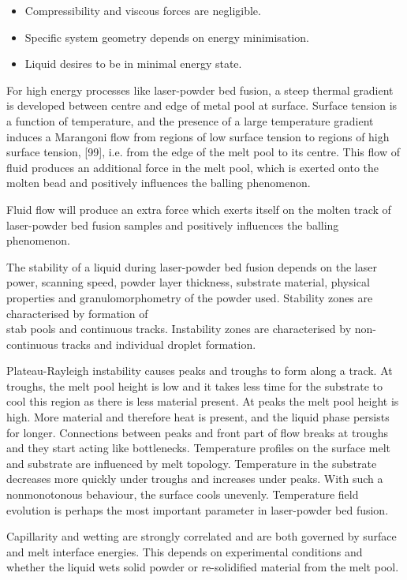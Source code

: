 \documentclass[10pt]{article}
\begin{document}
\begin{itemize}
  \item Compressibility and viscous forces are negligible.
  \item Specific system geometry depends on energy minimisation.
  \item Liquid desires to be in minimal energy state.
\end{itemize}

For high energy processes like laser-powder bed fusion, a steep thermal gradient is developed between centre and edge of metal pool at surface. Surface tension is a function of temperature, and the presence of a large temperature gradient induces a Marangoni flow from regions of low surface tension to regions of high surface tension, [99], i.e. from the edge of the melt pool to its centre. This flow of fluid produces an additional force in the melt pool, which is exerted onto the molten bead and positively influences the balling phenomenon.

Fluid flow will produce an extra force which exerts itself on the molten track of laser-powder bed fusion samples and positively influences the balling phenomenon.

The stability of a liquid during laser-powder bed fusion depends on the laser power, scanning speed, powder layer thickness, substrate material, physical properties and granulomorphometry of the powder used. Stability zones are characterised by formation of\\
stab pools and continuous tracks. Instability zones are characterised by non-continuous tracks and individual droplet formation.

Plateau-Rayleigh instability causes peaks and troughs to form along a track. At troughs, the melt pool height is low and it takes less time for the substrate to cool this region as there is less material present. At peaks the melt pool height is high. More material and therefore heat is present, and the liquid phase persists for longer. Connections between peaks and front part of flow breaks at troughs and they start acting like bottlenecks. Temperature profiles on the surface melt and substrate are influenced by melt topology. Temperature in the substrate decreases more quickly under troughs and increases under peaks. With such a nonmonotonous behaviour, the surface cools unevenly. Temperature field evolution is perhaps the most important parameter in laser-powder bed fusion.

Capillarity and wetting are strongly correlated and are both governed by surface and melt interface energies. This depends on experimental conditions and whether the liquid wets solid powder or re-solidified material from the melt pool.
\end{document}
